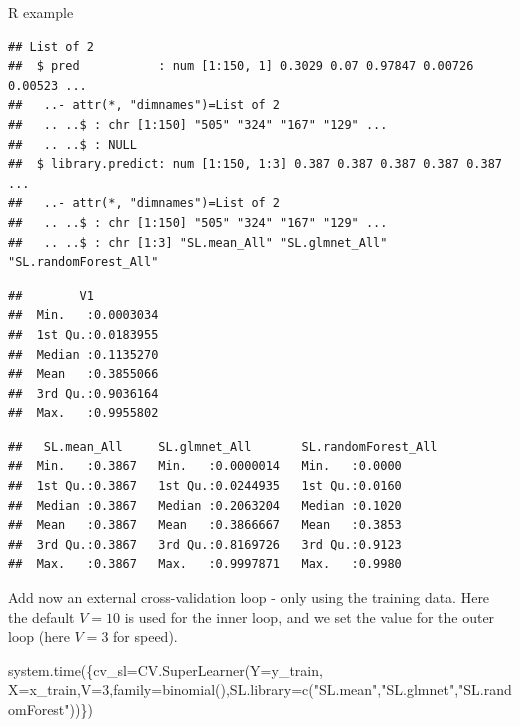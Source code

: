 \documentclass[
  ignorenonframetext,
]{beamer}
\newenvironment{Shaded}{\begin{snugshade}}{\end{snugshade}}
\newcommand{\AttributeTok}[1]{\textcolor[rgb]{0.77,0.63,0.00}{#1}}
\newcommand{\DecValTok}[1]{\textcolor[rgb]{0.00,0.00,0.81}{#1}}
\newcommand{\FunctionTok}[1]{\textcolor[rgb]{0.00,0.00,0.00}{#1}}
\newcommand{\NormalTok}[1]{#1}
\newcommand{\OtherTok}[1]{\textcolor[rgb]{0.56,0.35,0.01}{#1}}
\newcommand{\SpecialCharTok}[1]{\textcolor[rgb]{0.00,0.00,0.00}{#1}}
\newcommand{\StringTok}[1]{\textcolor[rgb]{0.31,0.60,0.02}{#1}}
\begin{document}
\begin{frame}[fragile]
\begin{block}{R example}
\begin{verbatim}
## List of 2
##  $ pred           : num [1:150, 1] 0.3029 0.07 0.97847 0.00726 0.00523 ...
##   ..- attr(*, "dimnames")=List of 2
##   .. ..$ : chr [1:150] "505" "324" "167" "129" ...
##   .. ..$ : NULL
##  $ library.predict: num [1:150, 1:3] 0.387 0.387 0.387 0.387 0.387 ...
##   ..- attr(*, "dimnames")=List of 2
##   .. ..$ : chr [1:150] "505" "324" "167" "129" ...
##   .. ..$ : chr [1:3] "SL.mean_All" "SL.glmnet_All" "SL.randomForest_All"
\end{verbatim}

\begin{Shaded}
\end{Shaded}

\begin{verbatim}
##        V1           
##  Min.   :0.0003034  
##  1st Qu.:0.0183955  
##  Median :0.1135270  
##  Mean   :0.3855066  
##  3rd Qu.:0.9036164  
##  Max.   :0.9955802
\end{verbatim}

\begin{Shaded}
\end{Shaded}

\begin{verbatim}
##   SL.mean_All     SL.glmnet_All       SL.randomForest_All
##  Min.   :0.3867   Min.   :0.0000014   Min.   :0.0000     
##  1st Qu.:0.3867   1st Qu.:0.0244935   1st Qu.:0.0160     
##  Median :0.3867   Median :0.2063204   Median :0.1020     
##  Mean   :0.3867   Mean   :0.3866667   Mean   :0.3853     
##  3rd Qu.:0.3867   3rd Qu.:0.8169726   3rd Qu.:0.9123     
##  Max.   :0.3867   Max.   :0.9997871   Max.   :0.9980
\end{verbatim}

Add now an external cross-validation loop - only using the training
data. Here the default \(V=10\) is used for the inner loop, and we set
the value for the outer loop (here \(V=3\) for speed).

\begin{Shaded}
\begin{Highlighting}[]
\FunctionTok{system.time}\NormalTok{(\{cv\_sl}\OtherTok{=}\FunctionTok{CV.SuperLearner}\NormalTok{(}\AttributeTok{Y=}\NormalTok{y\_train, }\AttributeTok{X=}\NormalTok{x\_train,}\AttributeTok{V=}\DecValTok{3}\NormalTok{,}\AttributeTok{family=}\FunctionTok{binomial}\NormalTok{(),}\AttributeTok{SL.library=}\FunctionTok{c}\NormalTok{(}\StringTok{"SL.mean"}\NormalTok{,}\StringTok{"SL.glmnet"}\NormalTok{,}\StringTok{"SL.randomForest"}\NormalTok{))\})}
\end{Highlighting}
\end{Shaded}


\end{block}
\end{frame}
\end{document}
